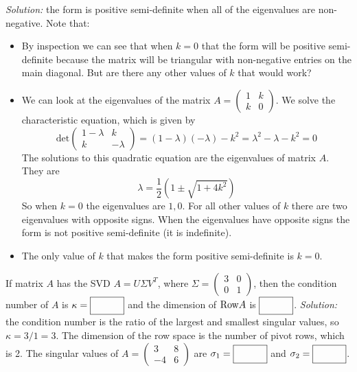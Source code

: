     \ifnum {} {\color{DarkBlue} \textit{Solution:} the form is positive semi-definite when all of the eigenvalues are non-negative. Note that:
    \begin{itemize}
        \item By inspection we can see that when $k=0$ that the form will be positive semi-definite because the matrix will be triangular with non-negative entries on the main diagonal. But are there any other values of $k$ that would work? 
        \item We can look at the eigenvalues of the matrix \(A = \begin{pmatrix} 1 & k \\ k & 0 \end{pmatrix}\). We solve the characteristic equation, which is given by
    \[ \text{det}\begin{pmatrix} 1-\lambda & k \\ k & -\lambda \end{pmatrix} = (1-\lambda)(-\lambda) - k^2 = \lambda^2 - \lambda - k^2 = 0 \]
    The solutions to this quadratic equation are the eigenvalues of matrix \(A\). They are
    $$\lambda = \frac12 \left( 1 \pm \sqrt{1 + 4 k^2}\right)$$ So when $k=0$ the eigenvalues are $1,0$. For all other values of $k$ there are two eigenvalues with opposite signs. When the eigenvalues have opposite signs the form is not positive semi-definite (it is indefinite). 
    \item The only value of $k$ that makes the form positive semi-definite is $k=0$. 
    \end{itemize}
    } \fi    
\fi 
\ifnum {}
    If matrix $A$ has the SVD $A=U\Sigma V^T$, where $\Sigma = \begin{pmatrix} 3&0\\0&1\end{pmatrix}$, then the condition number of $A$ is $\kappa = \framebox{\strut\hspace{1cm}}$ and the dimension of $\text{Row} A$ is $\framebox{\strut\hspace{1cm}}$.
    \ifnum {} {\color{DarkBlue} \textit{Solution:} the condition number is the ratio of the largest and smallest singular values, so $\kappa = 3/1 = 3$. The dimension of the row space is the number of pivot rows, which is 2. } \fi    
\fi 
\ifnum {}
    The singular values of $A=\begin{pmatrix} 3&8\\-4&6\end{pmatrix}$ are $\sigma_1 = \framebox{\strut\hspace{1cm}}$ and $\sigma_2 = \framebox{\strut\hspace{1cm}}$. 
    
